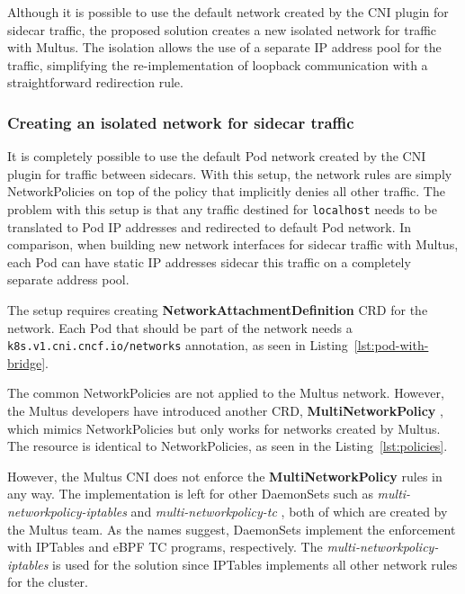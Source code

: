 \documentclass[english, 12pt, a4paper, sci, utf8, a-2b, online]{aaltothesis}
\begin{document}
Although it is possible to use the default network created by the CNI plugin for sidecar traffic, the proposed solution creates a new isolated network for traffic with Multus.
The isolation allows the use of a separate IP address pool for the traffic, simplifying the re-implementation of loopback communication with a straightforward redirection rule.

\subsubsection{Creating an isolated network for sidecar traffic}

It is completely possible to use the default Pod network created by the CNI plugin for traffic between sidecars.
With this setup, the network rules are simply NetworkPolicies on top of the policy that implicitly denies all other traffic.
The problem with this setup is that any traffic destined for \lstinline{localhost} needs to be translated to Pod IP addresses and redirected to default Pod network.
In comparison, when building new network interfaces for sidecar traffic with Multus, each Pod can have static IP addresses sidecar this traffic on a completely separate address pool.



The setup requires creating \textbf{NetworkAttachmentDefinition} CRD for the network.
Each Pod that should be part of the network needs a \lstinline{k8s.v1.cni.cncf.io/networks} annotation, as seen in Listing~\ref{lst:pod-with-bridge}.



The common NetworkPolicies are not applied to the Multus network.
However, the Multus developers have introduced another CRD, \textbf{MultiNetworkPolicy} \cite{multi-network-policy}, which mimics NetworkPolicies but only works for networks created by Multus.
The resource is identical to NetworkPolicies, as seen in the Listing~\ref{lst:policies}.



However, the Multus CNI does not enforce the \textbf{MultiNetworkPolicy} rules in any way.
The implementation is left for other DaemonSets such as \emph{multi-networkpolicy-iptables} \cite{multi-network-policy-iptables} and \emph{multi-networkpolicy-tc} \cite{multi-network-policy-tc}, both of which are created by the Multus team.
As the names suggest, DaemonSets implement the enforcement with IPTables and eBPF TC programs, respectively.
The \emph{multi-networkpolicy-iptables} is used for the solution since IPTables implements all other network rules for the cluster.
\end{document}
